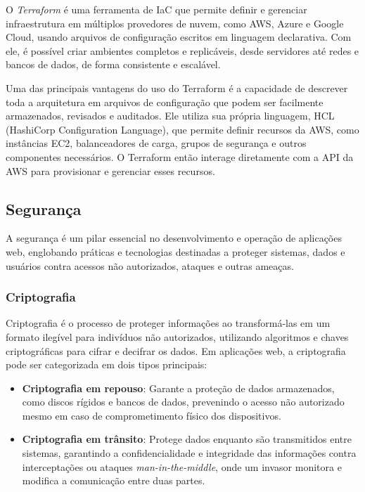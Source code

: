 O \emph{Terraform} é uma ferramenta de IaC que permite definir e gerenciar infraestrutura em múltiplos provedores de nuvem, como AWS, Azure e Google Cloud, usando arquivos de configuração escritos em linguagem declarativa\cite{terraform-docs}. Com ele, é possível criar ambientes completos e replicáveis, desde servidores até redes e bancos de dados, de forma consistente e escalável.

Uma das principais vantagens do uso do Terraform é a capacidade de descrever toda a arquitetura em arquivos de configuração que podem ser facilmente armazenados, revisados e auditados. Ele utiliza sua própria linguagem, HCL (HashiCorp Configuration Language), que permite definir recursos da AWS, como instâncias EC2, balanceadores de carga, grupos de segurança e outros componentes necessários. O Terraform então interage diretamente com a API da AWS para provisionar e gerenciar esses recursos.




\subsection{Segurança}

A segurança é um pilar essencial no desenvolvimento e operação de aplicações web, englobando práticas e tecnologias destinadas a proteger sistemas, dados e usuários contra acessos não autorizados, ataques e outras ameaças.


\subsubsection{Criptografia}


Criptografia é o processo de proteger informações ao transformá-las em um formato ilegível para indivíduos não autorizados, utilizando algoritmos e chaves criptográficas para cifrar e decifrar os dados. Em aplicações web, a criptografia pode ser categorizada em dois tipos principais:

\begin{itemize}
    \item \textbf{Criptografia em repouso}: Garante a proteção de dados armazenados, como discos rígidos e bancos de dados, prevenindo o acesso não autorizado mesmo em caso de comprometimento físico dos dispositivos.
    \item \textbf{Criptografia em trânsito}: Protege dados enquanto são transmitidos entre sistemas, garantindo a confidencialidade e integridade das informações contra interceptações ou ataques \emph{man-in-the-middle}, onde um invasor monitora e modifica a comunicação entre duas partes.
\end{itemize}

